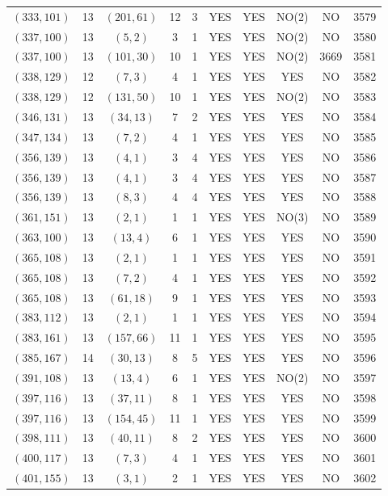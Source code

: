\begin{longtable}{|c|c|c|c|c|c|c|c|c|c|}
$(333, 101)$ & 13 & $(201, 61)$ & 12 & 3 & YES & YES & NO(2) & NO & 3579\\
$(337, 100)$ & 13 & $(5, 2)$ & 3 & 1 & YES & YES & NO(2) & NO & 3580\\
$(337, 100)$ & 13 & $(101, 30)$ & 10 & 1 & YES & YES & NO(2) & 3669 & 3581\\
$(338, 129)$ & 12 & $(7, 3)$ & 4 & 1 & YES & YES & YES & NO & 3582\\
$(338, 129)$ & 12 & $(131, 50)$ & 10 & 1 & YES & YES & NO(2) & NO & 3583\\
$(346, 131)$ & 13 & $(34, 13)$ & 7 & 2 & YES & YES & YES & NO & 3584\\
$(347, 134)$ & 13 & $(7, 2)$ & 4 & 1 & YES & YES & YES & NO & 3585\\
$(356, 139)$ & 13 & $(4, 1)$ & 3 & 4 & YES & YES & YES & NO & 3586\\
$(356, 139)$ & 13 & $(4, 1)$ & 3 & 4 & YES & YES & YES & NO & 3587\\
$(356, 139)$ & 13 & $(8, 3)$ & 4 & 4 & YES & YES & YES & NO & 3588\\
$(361, 151)$ & 13 & $(2, 1)$ & 1 & 1 & YES & YES & NO(3) & NO & 3589\\
$(363, 100)$ & 13 & $(13, 4)$ & 6 & 1 & YES & YES & YES & NO & 3590\\
$(365, 108)$ & 13 & $(2, 1)$ & 1 & 1 & YES & YES & YES & NO & 3591\\
$(365, 108)$ & 13 & $(7, 2)$ & 4 & 1 & YES & YES & YES & NO & 3592\\
$(365, 108)$ & 13 & $(61, 18)$ & 9 & 1 & YES & YES & YES & NO & 3593\\
$(383, 112)$ & 13 & $(2, 1)$ & 1 & 1 & YES & YES & YES & NO & 3594\\
$(383, 161)$ & 13 & $(157, 66)$ & 11 & 1 & YES & YES & YES & NO & 3595\\
$(385, 167)$ & 14 & $(30, 13)$ & 8 & 5 & YES & YES & YES & NO & 3596\\
$(391, 108)$ & 13 & $(13, 4)$ & 6 & 1 & YES & YES & NO(2) & NO & 3597\\
$(397, 116)$ & 13 & $(37, 11)$ & 8 & 1 & YES & YES & YES & NO & 3598\\
$(397, 116)$ & 13 & $(154, 45)$ & 11 & 1 & YES & YES & YES & NO & 3599\\
$(398, 111)$ & 13 & $(40, 11)$ & 8 & 2 & YES & YES & YES & NO & 3600\\
$(400, 117)$ & 13 & $(7, 3)$ & 4 & 1 & YES & YES & YES & NO & 3601\\
$(401, 155)$ & 13 & $(3, 1)$ & 2 & 1 & YES & YES & YES & NO & 3602\\

\end{longtable}
